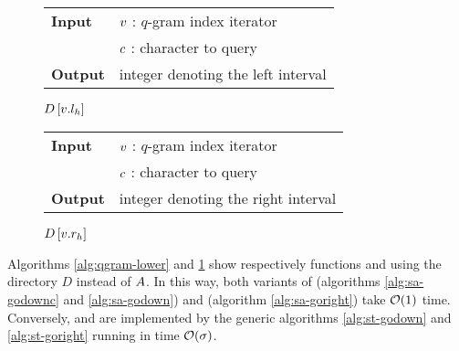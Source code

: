 \begin{figure*}[b!]
\begin{minipage}[b]{.5\textwidth}
\begin{algorithm}[H]
\begin{tabular}{ll}
\textbf{Input}  & $v$ : $q$-gram index iterator\\
				& $c$ : character to query\\
\textbf{Output} & integer denoting the left interval\\
\end{tabular}
\begin{algorithmic}[1]
\State \Return $D\left[v.l_h\right]$
\end{algorithmic}
\label{alg:qgram-lower}
\end{algorithm}
\end{minipage}
\hfill
\begin{minipage}[b]{.5\textwidth}
\begin{algorithm}[H]
\begin{tabular}{ll}
\textbf{Input}  & $v$ : $q$-gram index iterator\\
				& $c$ : character to query\\
\textbf{Output} & integer denoting the right interval\\
\end{tabular}
\begin{algorithmic}[1]
\State \Return $D\left[v.r_h\right]$
\end{algorithmic}
\label{alg:qgram-upper}
\end{algorithm}
\end{minipage}
\end{figure*}

Algorithms \ref{alg:qgram-lower} and \ref{alg:qgram-upper} show respectively functions  and  using the directory $D$ instead of $A$.
In this way, both variants of  (algorithms \ref{alg:sa-godownc} and \ref{alg:sa-godown}) and  (algorithm \ref{alg:sa-goright}) take $\mathcal{O}(1)$ time.
Conversely,  and  are implemented by the generic algorithms \ref{alg:st-godown} and \ref{alg:st-goright} running in time $\mathcal{O}(\sigma)$.

